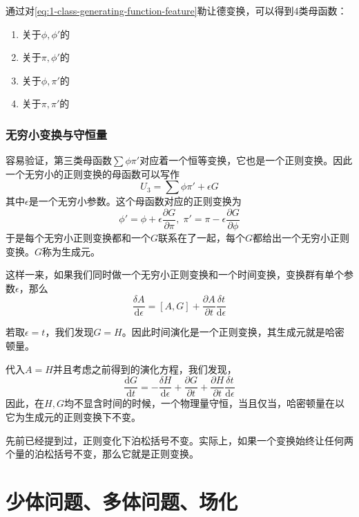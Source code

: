 \documentclass[UTF8, a4paper]{ctexart}
\begin{document}
通过对\eqref{eq:1-class-generating-function-feature}勒让德变换，可以得到4类母函数：
\begin{enumerate}
    \item 关于$\phi, \phi'$的
    \item 关于$\pi, \phi'$的
    \item 关于$\phi, \pi'$的
    \item 关于$\pi, \pi'$的
\end{enumerate}

\subsubsection{无穷小变换与守恒量}
容易验证，第三类母函数$\sum \phi \pi'$对应着一个恒等变换，它也是一个正则变换。因此一个无穷小的正则变换的母函数可以写作
\[
    U_3 = \sum \phi \pi' + \epsilon G
\]
其中$\epsilon$是一个无穷小参数。这个母函数对应的正则变换为
\begin{equation}
    \phi' = \phi + \epsilon \frac{\partial G}{\partial \pi}, \; \pi' = \pi - \epsilon \frac{\partial G}{\partial \phi}
\end{equation}
于是每个无穷小正则变换都和一个$G$联系在了一起，每个$G$都给出一个无穷小正则变换。$G$称为生成元。

这样一来，如果我们同时做一个无穷小正则变换和一个时间变换，变换群有单个参数$\epsilon$，那么
\begin{equation}
    \frac{\delta A}{\mathrm{d} \epsilon} = [A, G] + \frac{\partial A}{\partial t} \frac{\delta t}{\mathrm{d} \epsilon}
    \label{eq:variation-under-infinite-canonical-transformation}
\end{equation}

若取$\epsilon = t$，我们发现$G=H$。因此时间演化是一个正则变换，其生成元就是哈密顿量。

代入$A=H$并且考虑之前得到的演化方程，我们发现，
\begin{equation}
    \frac{\mathrm{d}G}{\mathrm{d}t} = - \frac{\delta H}{\mathrm{d} \epsilon} + \frac{\partial G}{\partial t} + \frac{\partial H}{\partial t} \frac{\delta t}{\mathrm{d} \epsilon}
\end{equation}
因此，在$H,G$均不显含时间的时候，一个物理量守恒，当且仅当，哈密顿量在以它为生成元的正则变换下不变。

先前已经提到过，正则变化下泊松括号不变。实际上，如果一个变换始终让任何两个量的泊松括号不变，那么它就是正则变换。

\section{少体问题、多体问题、场化}
\end{document}
